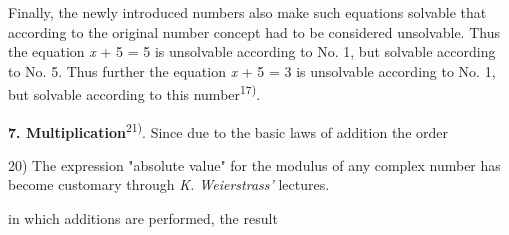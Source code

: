 Finally, the newly introduced numbers also make such equations solvable that according to the original number concept had to be considered unsolvable. Thus the equation \textit{x} + 5 = 5 is unsolvable according to No. 1, but solvable according to No. 5. Thus further the equation \textit{x} + 5 = 3 is unsolvable according to No. 1, but solvable according to this number\textsuperscript{17)}.

\textbf{7. Multiplication}\textsuperscript{21)}. Since due to the basic laws of addition the order

\vspace{0cm}
\leftline{\rule{2in}{0.4pt}}
\vspace{0.1cm}
{
\footnotesize
20) The expression "absolute value" for the modulus of any complex number has become customary through \textit{K. Weierstrass'} lectures.

}
in which additions are performed, the result